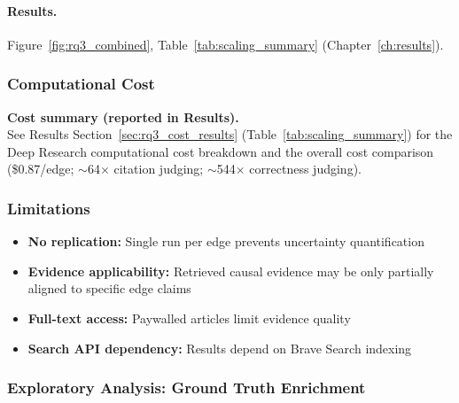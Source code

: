 \paragraph{Results.}
Figure~\ref{fig:rq3_combined}, Table~\ref{tab:scaling_summary} (Chapter~\ref{ch:results}).

\subsubsection{Computational Cost}
\label{sec:rq3_computational_cost}

\noindent\textbf{Cost summary (reported in Results).}\\
See Results Section~\ref{sec:rq3_cost_results} (Table~\ref{tab:scaling_summary}) for the Deep Research computational cost breakdown and the overall cost comparison (\$0.87/edge; $\sim$64$\times$ citation judging; $\sim$544$\times$ correctness judging).

\subsubsection{Limitations}
\label{sec:rq3_limitations}

\begin{itemize}[noitemsep]
    \item \textbf{No replication:} Single run per edge prevents uncertainty quantification
    \item \textbf{Evidence applicability:} Retrieved causal evidence may be only partially aligned to specific edge claims
    \item \textbf{Full-text access:} Paywalled articles limit evidence quality
    \item \textbf{Search API dependency:} Results depend on Brave Search indexing
\end{itemize}

\subsubsection{Exploratory Analysis: Ground Truth Enrichment}
\label{sec:gt_enrichment_method}

